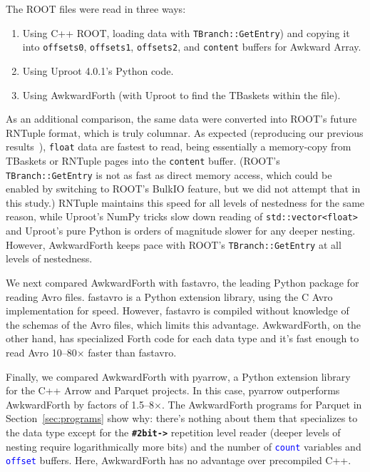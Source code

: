 \documentclass{webofc}
\begin{document}
The ROOT files were read in three ways:
\begin{enumerate}
\item Using C++ ROOT, loading data with \texttt{TBranch::GetEntry}) and copying it into \texttt{offsets0}, \texttt{offsets1}, \texttt{offsets2}, and \texttt{content} buffers for Awkward Array.
\item Using Uproot 4.0.1's Python code.
\item Using AwkwardForth (with Uproot to find the TBaskets within the file).
\end{enumerate}

\noindent As an additional comparison, the same data were converted into ROOT's future RNTuple format, which is truly columnar. As expected (reproducing our previous results~\cite{chep2019}), \texttt{float} data are fastest to read, being essentially a memory-copy from TBaskets or RNTuple pages into the \texttt{content} buffer. (ROOT's \texttt{TBranch::GetEntry} is not as fast as direct memory access, which could be enabled by switching to ROOT's BulkIO feature, but we did not attempt that in this study.) RNTuple maintains this speed for all levels of nestedness for the same reason, while Uproot's NumPy tricks slow down reading of \texttt{std::vector<float>} and Uproot's pure Python is orders of magnitude slower for any deeper nesting. However, AwkwardForth keeps pace with ROOT's \texttt{TBranch::GetEntry} at all levels of nestedness.

We next compared AwkwardForth with fastavro, the leading Python package for reading Avro files. fastavro is a Python extension library, using the C Avro implementation for speed. However, fastavro is compiled without knowledge of the schemas of the Avro files, which limits this advantage. AwkwardForth, on the other hand, has specialized Forth code for each data type and it's fast enough to read Avro 10--80$\times$ faster than fastavro.

Finally, we compared AwkwardForth with pyarrow, a Python extension library for the C++ Arrow and Parquet projects. In this case, pyarrow outperforms AwkwardForth by factors of 1.5--8$\times$. The AwkwardForth programs for Parquet in Section~\ref{sec:programs} show why: there's nothing about them that specializes to the data type except for the \textcolor{OliveGreen}{\tt\textbf{\#2bit->}} repetition level reader (deeper levels of nesting require logarithmically more bits) and the number of \textcolor{blue}{\tt count} variables and \textcolor{blue}{\tt offset} buffers. Here, AwkwardForth has no advantage over precompiled C++.
\end{document}
